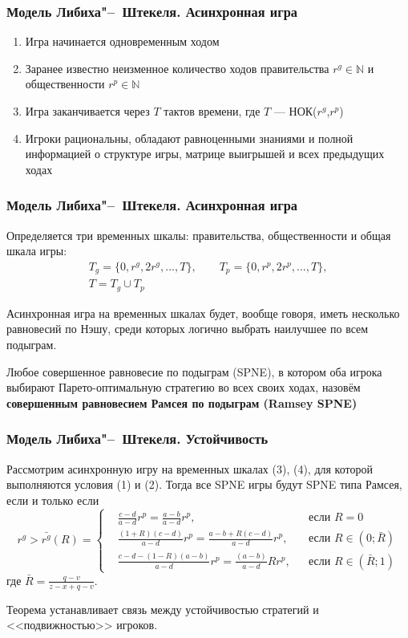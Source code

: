 \documentclass {beamer}
\begin{document}
\begin{frame}
\frametitle{Модель Либиха"--~Штекеля. Асинхронная игра}
\begin{enumerate}
	\item Игра начинается одновременным ходом
	\item Заранее известно неизменное количество ходов правительства $r^g
		\in \mathbb{N}$ и общественности $r^p \in \mathbb{N}$
	\item Игра заканчивается через $T$ тактов времени, где $T$ --- НОК($r^g$,$r^p$)
	\item Игроки рациональны, обладают равноценными знаниями и полной
		информацией о структуре игры, матрице выигрышей и всех
		предыдущих ходах
\end{enumerate}
\end{frame}

\begin{frame}
\frametitle{Модель Либиха"--~Штекеля. Асинхронная игра}
Определяется три временных шкалы: правительства, общественности и общая шкала игры:
\begin{gather}
	\label{eq:sec:tech:scales}
	T_g = \{0,r^g,2r^g,...,T\}, \qquad T_p=\{0,r^p,2r^p,...,T\}, \\
	T = T_g \cup T_p 	
\end{gather}
	
Асинхронная игра на временных шкалах будет, вообще говоря, иметь несколько
равновесий по Нэшу, среди которых логично выбрать наилучшее по всем подыграм.
\begin{definition}
	Любое совершенное равновесие по подыграм (SPNE), в котором оба игрока
	выбирают Парето-оптимальную стратегию  во всех своих ходах, назовём
	\textbf{совершенным равновесием Рамсея по подыграм (Ramsey SPNE)}
\end{definition}
\end{frame}


\begin{frame}
\frametitle{Модель Либиха"--~Штекеля. Устойчивость}
	\begin{theorem}
	\small	Рассмотрим асинхронную игру на временных шкалах (3), (4), 
	для которой выполняются условия (1) и (2). Тогда все SPNE игры будут SPNE типа Рамсея,
	если и только если 
	{\scriptsize
		\begin{equation}
		\label{eq:sec:tech:theoremSystem}
		r^g> \bar{r^g}(R) = \left\{ 
		\begin{aligned} 
		&\frac{c - d}{a-d}r^p= \frac{a-b}{a-d}r^p, &&\text{если } R=0
		\\
		&\frac{(1+R)(c-d)}{a-d}r^p= \frac{a-b + R(c-d)}{a-d}r^p, &&\text{если } 	R\in(0; \bar{R})
		\\
		&\frac{c-d-(1-R)(a-b)}{a-d}r^p= \frac{(a-b)}{a-d}Rr^p, &&\text{если } 	R\in(\bar{R};1)
		\end{aligned}
		\right.		
		\end{equation}
	}
	где $\bar{R}=\frac{q-v}{z-x+q-v}$. 
\end{theorem}

Теорема устанавливает связь между устойчивостью стратегий и <<подвижностью>>
игроков.
\end{frame}
\end{document}
